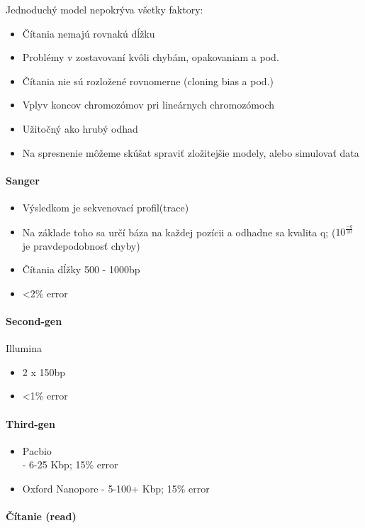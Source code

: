 				Jednoduchý model nepokrýva všetky faktory:
				\begin{itemize}
					\item Čítania nemajú rovnakú dĺžku
					\item Problémy v zostavovaní kvôli chybám, opakovaniam a pod.
					\item Čítania nie sú rozložené rovnomerne (cloning bias a pod.)
					\item Vplyv koncov chromozómov pri lineárnych chromozómoch
					\item Užitočný ako hrubý odhad
					\item Na spresnenie môžeme skúšat spraviť zložitejšie modely, alebo simulovať data
				\end{itemize}
			
			\paragraph{Sanger}
				\begin{itemize}
					\item Výsledkom je sekvenovací profil(trace)
					\item Na základe toho sa určí báza na každej pozícii a odhadne sa kvalita q; ($10^{ \frac{-q}{10}}$ je pravdepodobnosť chyby)
					\item Čítania dĺžky 500 - 1000bp
					\item <2\% error
				\end{itemize}
			\paragraph{Second-gen}
				Illumina
				\begin{itemize}
					\item 2 x 150bp
					\item <1\% error
				\end{itemize}
			\paragraph{Third-gen}
				\begin{itemize}
					\item Pacbio\\
						- 6-25 Kbp; 15\% error
					\item Oxford Nanopore
						- 5-100+ Kbp; 15\% error
				\end{itemize}

			\paragraph{Čítanie (read)}

